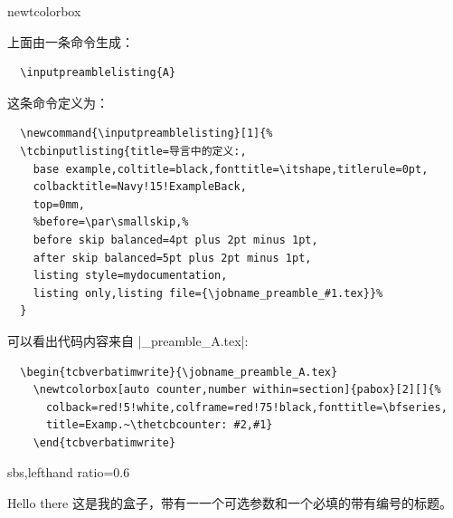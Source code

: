 \begin{docCommand}{newtcolorbox}{}

\begin{tcolorbox}[breakable, title=译者对上面这个盒子的分析]
  上面由一条命令生成：

  \begin{verbatim}
  \inputpreamblelisting{A}
  \end{verbatim}

  \tcbline  

  这条命令定义为：
  \begin{verbatim}
  \newcommand{\inputpreamblelisting}[1]{%
  \tcbinputlisting{title=导言中的定义:,
    base example,coltitle=black,fonttitle=\itshape,titlerule=0pt,
    colbacktitle=Navy!15!ExampleBack,
    top=0mm,
    %before=\par\smallskip,%
    before skip balanced=4pt plus 2pt minus 1pt,
    after skip balanced=5pt plus 2pt minus 1pt,
    listing style=mydocumentation,
    listing only,listing file={\jobname_preamble_#1.tex}}%
  }
  \end{verbatim}

  \tcbline  

  可以看出代码内容来自 |\jobname_preamble_A.tex|:
  \begin{verbatim}
  \begin{tcbverbatimwrite}{\jobname_preamble_A.tex}
    \newtcolorbox[auto counter,number within=section]{pabox}[2][]{%
      colback=red!5!white,colframe=red!75!black,fonttitle=\bfseries,
      title=Examp.~\thetcbcounter: #2,#1}
    \end{tcbverbatimwrite}
  \end{verbatim}
\end{tcolorbox}


\begin{dispExample*}{sbs,lefthand ratio=0.6}
\begin{pabox}[colback=yellow]{Hello there}
这是我的盒子，带有一一个可选参数和一个必填的带有编号的标题。
\end{pabox}
\end{dispExample*}
\end{docCommand}




